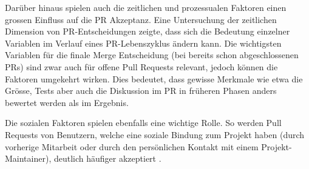 Darüber hinaus spielen auch die zeitlichen und prozessualen Faktoren einen grossen Einfluss auf die PR Akzeptanz. Eine Untersuchung der zeitlichen Dimension von PR-Entscheidungen zeigte, dass sich die Bedeutung einzelner Variablen im Verlauf eines PR-Lebenszyklus ändern kann. Die wichtigsten Variablen für die finale Merge Entscheidung (bei bereits schon abgeschlossenen PRs) sind zwar auch für offene Pull Requests relevant, jedoch können die Faktoren umgekehrt wirken. Dies bedeutet, dass gewisse Merkmale wie etwa die Grösse, Tests aber auch die Diskussion im PR in früheren Phasen anders bewertet werden als im Ergebnis. 

Die sozialen Faktoren spielen ebenfalls eine wichtige Rolle. So werden Pull Requests von Benutzern, welche eine soziale Bindung zum Projekt haben (durch vorherige Mitarbeit oder durch den persönlichen Kontakt mit einem Projekt-Maintainer), deutlich häufiger akzeptiert \parencite{tsay_influence_2014}. 
